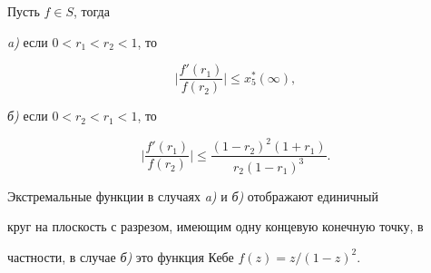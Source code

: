 \begin{thm}


Пусть $f \in S$, тогда


{\em a)} если $0 < r_1 < r_2 < 1 $, то


$$


\biggl|\frac{f'(r_1)}{f(r_2)}\biggr| \le x^*_5(\infty),


$$


{\em б)} если $0 < r_2 < r_1 < 1$, то


$$


\biggl|\frac{f'(r_1)}{f(r_2)}\biggr| \le


\frac{(1-r_2)^2(1+r_1)}{r_2(1-r_1)^3}.


$$


Экстремальные функции в случаях {\em a)} и {\em б)} отображают единичный


круг на плоскость с разрезом, имеющим одну концевую конечную точку, в


частности, в случае {\em б)} это функция Кебе $f(z)=z/(1-z)^2$.


\end{thm}








